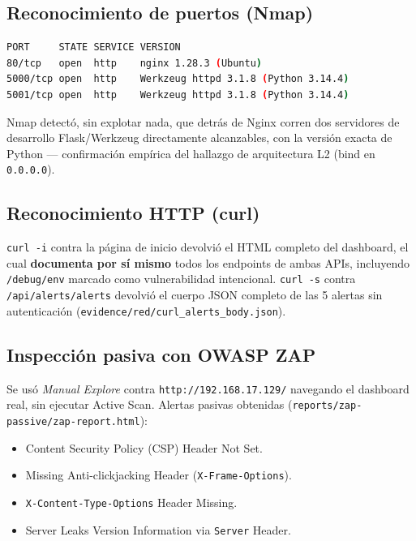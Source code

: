 \documentclass[journal]{IEEEtran}
\begin{document}
\subsection{Reconocimiento de puertos (Nmap)}

\begin{lstlisting}[language=bash, caption={nmap -sV sobre 80, 5000 y 5001 (evidence/red/nmap\_ports\_extra.nmap)}]
PORT     STATE SERVICE VERSION
80/tcp   open  http    nginx 1.28.3 (Ubuntu)
5000/tcp open  http    Werkzeug httpd 3.1.8 (Python 3.14.4)
5001/tcp open  http    Werkzeug httpd 3.1.8 (Python 3.14.4)
\end{lstlisting}

Nmap detectó, sin explotar nada, que detrás de Nginx corren dos servidores de
desarrollo Flask/Werkzeug directamente alcanzables, con la versión exacta de
Python --- confirmación empírica del hallazgo de arquitectura L2 (bind en
\texttt{0.0.0.0}).

\subsection{Reconocimiento HTTP (curl)}

\texttt{curl -i} contra la página de inicio devolvió el HTML completo del
dashboard, el cual \textbf{documenta por sí mismo} todos los endpoints de
ambas APIs, incluyendo \texttt{/debug/env} marcado como vulnerabilidad
intencional. \texttt{curl -s} contra \texttt{/api/alerts/alerts} devolvió el
cuerpo JSON completo de las 5 alertas sin autenticación
(\texttt{evidence/red/curl\_alerts\_body.json}).

\subsection{Inspección pasiva con OWASP ZAP}

Se usó \textit{Manual Explore} contra \texttt{http://192.168.17.129/}
navegando el dashboard real, sin ejecutar Active Scan. Alertas pasivas
obtenidas (\texttt{reports/zap-passive/zap-report.html}):

\begin{itemize}
    \item Content Security Policy (CSP) Header Not Set.
    \item Missing Anti-clickjacking Header (\texttt{X-Frame-Options}).
    \item \texttt{X-Content-Type-Options} Header Missing.
    \item Server Leaks Version Information via \texttt{Server} Header.
\end{itemize}
\end{document}
